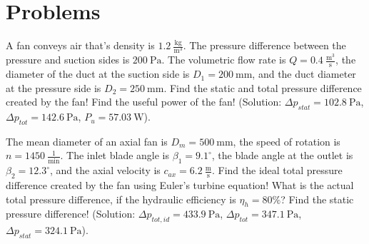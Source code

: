 \section{Problems}


A fan conveys air that's density is $1.2~\frac{\mathrm{kg}}{\mathrm{m^3}}$. 
The pressure difference between the pressure and suction sides is $200~\mathrm{Pa}$. 
The volumetric flow rate is $Q=0.4~\frac{\mathrm{m^3}}{\mathrm{s}}$, the diameter of the duct at the suction side is $D_1=200~\mathrm{mm}$, and the duct diameter at the pressure side is $D_2=250~\mathrm{mm}$. Find the static and total pressure difference created by the fan! Find the useful power of the fan! (Solution: $\Delta p_{stat} = 102.8~\mathrm{Pa}$, $\Delta p_{tot} = 142.6~\mathrm{Pa}$, $P_u = 57.03~\mathrm{W}$). 



\vspace{1cm}

The mean diameter of an axial fan is $D_m = 500~\mathrm{mm}$, the speed of rotation is $n=1450~\frac{1}{\mathrm{min}}$. The inlet blade angle is $\beta_1 = 9.1^\circ$, the blade angle at the outlet is $\beta_2 = 12.3^\circ$, and the axial velocity is $c_{ax} = 6.2~\frac{\mathrm{m}}{\mathrm{s}}$. Find the ideal total pressure difference created by the fan using Euler's turbine equation! What is the actual total pressure difference, if the hydraulic efficiency is $\eta_h=80\%$? Find the static pressure difference! (Solution: $\Delta p_{tot,id} = 433.9~\mathrm{Pa}$, $\Delta p_{tot} = 347.1~\mathrm{Pa}$, $\Delta p_{stat} = 324.1~\mathrm{Pa}$).



